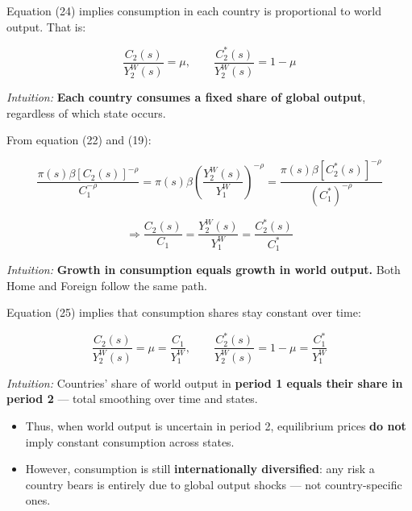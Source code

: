 \documentclass[12pt]{article}
\begin{document}
\vspace{0.5em}

Equation (24) implies consumption in each country is proportional to world output. That is:

\begin{equation}
    \frac{C_2(s)}{Y_2^W(s)} = \mu, \qquad 
    \frac{C_2^*(s)}{Y_2^W(s)} = 1 - \mu
\end{equation}

\textit{Intuition:} \textbf{Each country consumes a fixed share of global output}, regardless of which state occurs.

\vspace{0.5em}

From equation (22) and (19):

\begin{equation}
    \frac{\pi(s)\beta[C_2(s)]^{-\rho}}{C_1^{-\rho}} = 
    \pi(s)\beta \left( \frac{Y_2^W(s)}{Y_1^W} \right)^{-\rho}
    = \frac{\pi(s)\beta[C_2^*(s)]^{-\rho}}{(C_1^*)^{-\rho}}
\end{equation}

\[
\Rightarrow \frac{C_2(s)}{C_1} = \frac{Y_2^W(s)}{Y_1^W} = \frac{C_2^*(s)}{C_1^*}
\tag{25}
\]

\textit{Intuition:} \textbf{Growth in consumption equals growth in world output.} Both Home and Foreign follow the same path.

\vspace{0.5em}

Equation (25) implies that consumption shares stay constant over time:

\[
\frac{C_2(s)}{Y_2^W(s)} = \mu = \frac{C_1}{Y_1^W}, \qquad 
\frac{C_2^*(s)}{Y_2^W(s)} = 1 - \mu = \frac{C_1^*}{Y_1^W}
\]

\textit{Intuition:} Countries’ share of world output in \textbf{period 1 equals their share in period 2} — total smoothing over time and states.

\vspace{1em}

\begin{itemize}
    \item Thus, when world output is uncertain in period 2, equilibrium prices \textbf{do not} imply constant consumption across states.
    
    \item However, consumption is still \textbf{internationally diversified}: any risk a country bears is entirely due to global output shocks — not country-specific ones.
\end{itemize}
\end{document}
